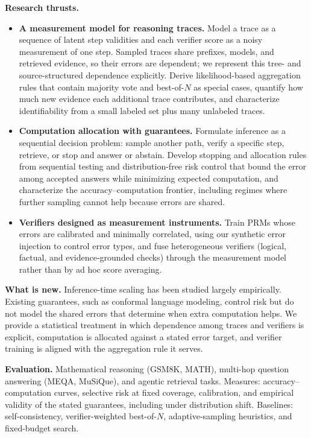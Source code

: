 \documentclass[11pt]{article}
\newcommand{\head}[1]{{\color{navy}\textbf{#1}}\enspace}
\begin{document}
\head{Research thrusts.}
\begin{itemize}
\item \textbf{A measurement model for reasoning traces.} Model a trace as a sequence of latent step validities and each verifier score as a noisy measurement of one step. Sampled traces share prefixes, models, and retrieved evidence, so their errors are dependent; we represent this tree- and source-structured dependence explicitly. Derive likelihood-based aggregation rules that contain majority vote and best-of-$N$ as special cases, quantify how much new evidence each additional trace contributes, and characterize identifiability from a small labeled set plus many unlabeled traces.
\item \textbf{Computation allocation with guarantees.} Formulate inference as a sequential decision problem: sample another path, verify a specific step, retrieve, or stop and answer or abstain. Develop stopping and allocation rules from sequential testing and distribution-free risk control that bound the error among accepted answers while minimizing expected computation, and characterize the accuracy--computation frontier, including regimes where further sampling cannot help because errors are shared.
\item \textbf{Verifiers designed as measurement instruments.} Train PRMs whose errors are calibrated and minimally correlated, using our synthetic error injection to control error types, and fuse heterogeneous verifiers (logical, factual, and evidence-grounded checks) through the measurement model rather than by ad hoc score averaging.
\end{itemize}

\head{What is new.} Inference-time scaling has been studied largely empirically. Existing guarantees, such as conformal language modeling, control risk but do not model the shared errors that determine when extra computation helps. We provide a statistical treatment in which dependence among traces and verifiers is explicit, computation is allocated against a stated error target, and verifier training is aligned with the aggregation rule it serves.

\head{Evaluation.} Mathematical reasoning (GSM8K, MATH), multi-hop question answering (MEQA, MuSiQue), and agentic retrieval tasks. Measures: accuracy--computation curves, selective risk at fixed coverage, calibration, and empirical validity of the stated guarantees, including under distribution shift. Baselines: self-consistency, verifier-weighted best-of-$N$, adaptive-sampling heuristics, and fixed-budget search.
\end{document}
